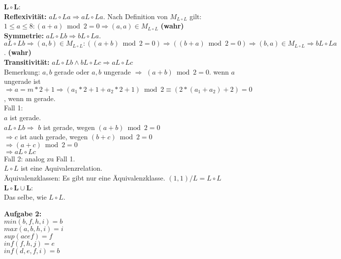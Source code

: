 \documentclass[a4paper]{scrartcl}
\begin{document}
\begin{flushleft}
		$\mathbf{L\circ L}$:\\
		\textbf{Reflexivität:} $aL\circ La\Rightarrow aL\circ La$. Nach Definition von $M_{L\circ L}$ gilt: $1\leq a\leq 8: (a+a)\bmod 2= 0\Rightarrow (a,a)\in M_{L\circ L}$ \textbf{(wahr)}\\
		\textbf{Symmetrie:} $aL\circ Lb\Rightarrow bL\circ La$.\\ $aL\circ Lb\Rightarrow (a,b)\in M_{L\circ L}:((a+b)\bmod 2 = 0)\Rightarrow((b+a)\bmod 2= 0)\Rightarrow(b,a)\in M_{L\circ L} \Rightarrow bL\circ La$. \textbf{(wahr)}\\
		\textbf{Transitivität:} $aL\circ Lb\wedge bL\circ Lc\Rightarrow aL\circ Lc$ \\
		Bemerkung: $a,b$ gerade oder $a,b$ ungerade $\Rightarrow$ $(a+b)\bmod 2= 0$. wenn $a$ ungerade ist $\Rightarrow a=m*2+1\Rightarrow (a_1*2+1 + a_2*2 + 1) \bmod 2\equiv (2*(a_1 + a_2) + 2) = 0$, wenn m gerade.\\
		Fall 1:\\
		$a$ ist gerade.\\
		$aL\circ Lb\Rightarrow$ $b$ ist gerade, wegen $(a+b)\bmod 2= 0$\\
		$\Rightarrow c$ ist auch gerade, wegen $(b+c)\bmod 2= 0$\\
		$\Rightarrow (a+c)\bmod 2 = 0$\\
		$\Rightarrow aL\circ Lc$\\
		Fall 2: analog zu Fall 1.\\
		$L\circ L$ ist eine Aquivalenzrelation.\\
		Äquivalenzklassen: Es gibt nur eine Äquivalenzklasse. $(1,1)/L=L\circ L$\\[1em]
		$\mathbf{L\circ L\cup L}$:\\
		Das selbe, wie $L\circ L$.\\[1em]
	\end{flushleft}
	\begin{flushleft}
		\textbf{Aufgabe 2:}\\
		$min({b,f,h,i}) = b$\\
		$max({a,b,h,i}) = i$\\
		$sup({acef}) = f$\\
		$inf({f,h,j}) = e$\\
		$inf({d,e,f,i}) = b$\\[1em]
	\end{flushleft}
\end{document}
